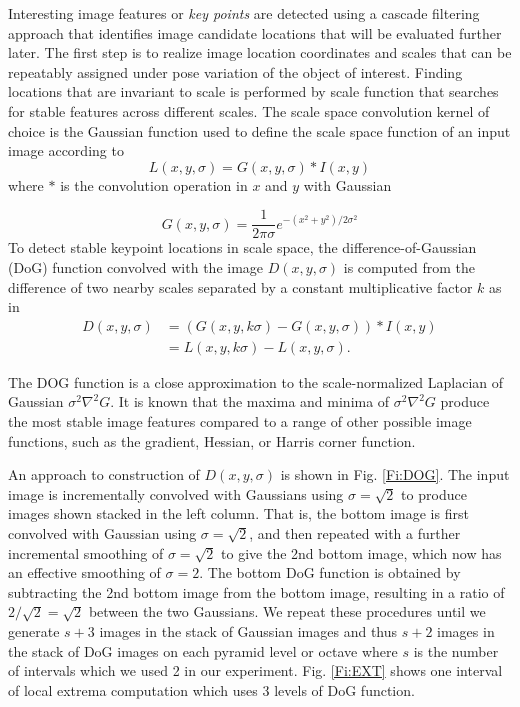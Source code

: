 \documentclass{article}
\begin{document}
Interesting image features or {\em key points} are detected using a cascade filtering approach that identifies image candidate locations that will be evaluated further later. 
The first step is to realize image location coordinates and scales that can be repeatably assigned under pose variation of the object of interest.  
Finding locations that are invariant to scale is performed by scale function that searches for stable features across different scales.  
The scale space convolution kernel of choice is the Gaussian function used to define the scale space function of an input image according to
\begin{equation}
  L(x,y,\sigma) = G(x,y,\sigma)\ast I (x,y)
\end{equation}
where $\ast$ is the convolution operation in $x$ and $y$ with Gaussian

\begin{equation}
  G(x,y,\sigma) = \frac{1}{2\pi \sigma}e^{-(x^2+y^2)/2\sigma^2}
\end{equation}
To detect stable keypoint locations in scale space, the difference-of-Gaussian (DoG) function convolved with the image $D(x,y,\sigma)$ is computed from the difference of two nearby scales separated by a constant multiplicative factor $k$ as in
\begin{align}
  D(x,y,\sigma) &= (G(x,y,k\sigma)-G(x,y,\sigma))\ast I(x,y)\\
  &= L(x,y,k\sigma)-L(x,y,\sigma).
\end{align}

The DOG function is a close approximation to the scale-normalized Laplacian of Gaussian $\sigma^2\nabla^2G$.  
It is known that the maxima and minima of $\sigma^2\nabla^2G$ produce the most stable image features compared to a range of other possible image functions, such as the gradient, Hessian, or Harris corner function. 

An approach to construction of $D(x,y,\sigma)$ is shown in Fig. \ref{Fi:DOG}. 
The input image is incrementally convolved with Gaussians using $ \sigma = \sqrt{2} $ to produce images shown stacked in the left column. 
That is, the bottom image is first convolved with Gaussian using $ \sigma = \sqrt{2} $, 
and then repeated with a further incremental smoothing of $\sigma = \sqrt{2}$ to give the 2nd bottom image, which now has an effective smoothing of $ \sigma = 2 $. 
The bottom DoG function is obtained by subtracting the 2nd bottom image from the bottom image, resulting in a ratio of $ 2 / \sqrt{2} = \sqrt{2} $ between the two Gaussians. 
We repeat these procedures until we generate $s+3$ images in the stack of Gaussian images and thus $s+2$ images in the stack of DoG images on each pyramid level or octave where $s$ is the number of intervals which we used 2 in our experiment. 
Fig. \ref{Fi:EXT} shows one interval of local extrema computation which uses 3 levels of DoG function. 
\end{document}
